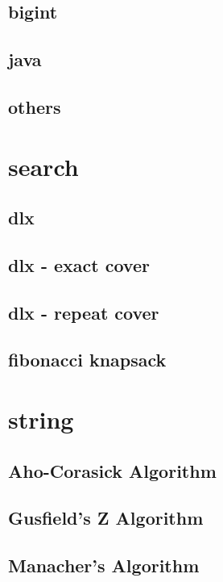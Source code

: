 \documentclass[a4paper,5pt,twocolumn,titlepage]{article}
\begin{document}
\subsection{bigint}

\subsection{java}

\subsection{others}

\section{search}
\subsection{dlx}

\subsection{dlx - exact cover}

\subsection{dlx - repeat cover}

\subsection{fibonacci knapsack}

\section{string}
\subsection{Aho-Corasick Algorithm}

\subsection{Gusfield's Z Algorithm}

\subsection{Manacher's Algorithm}

\end{document}
